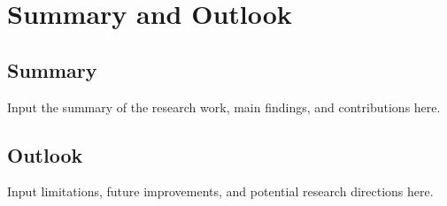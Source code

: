 \chapter{Summary and Outlook}

\section{Summary}
Input the summary of the research work, main findings, and contributions here.

\section{Outlook}
Input limitations, future improvements, and potential research directions here.
